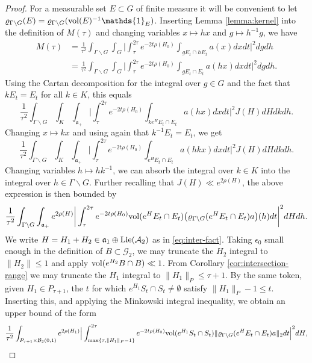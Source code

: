 \documentclass[12pt]{amsart}
\theoremstyle{remark}
\newcommand{\ga}{\mathfrak a}
\begin{document}
\begin{proof}
For a measurable set $E\subset G$ of finite measure it will be convenient to let $\varrho_{\Gamma\backslash G}(E)=\varrho_{\Gamma\backslash G}({\rm vol}(E)^{-1}{\mathds{1}}_E)$.  Inserting Lemma \ref{lemma:kernel} into the definition of $M(\tau)$ and changing variables $x\mapsto hx$ and $g\mapsto h^{-1}g$, we have
\begin{align*}
M(\tau)&=\frac{1}{\tau^2}\int_{\Gamma\backslash G}\int_G \bigg| \int_{\tau}^{2\tau} e^{-2t\rho(H_0)}\int_{gE_t\cap hE_t}a(x)dx dt\bigg|^2dg dh\\
&=\frac{1}{\tau^2}\int_{\Gamma\backslash G}\int_G \bigg| \int_{\tau}^{2\tau} e^{-2t\rho(H_0)}\int_{gE_t\cap E_t}a(hx)dx dt\bigg|^2dg dh.
\end{align*}
Using the Cartan decomposition for the integral over $g\in G$ and the fact that $kE_t=E_t$ for all $k\in K$, this equals
\[
\frac{1}{\tau^2}\int_{\Gamma\backslash G}\int_K \int_{\ga_+} \bigg| \int_{\tau}^{2\tau} e^{-2t\rho(H_0)}\int_{ke^H E_t\cap E_t}a(hx)dx dt\bigg|^2 J(H) dH dk dh.
\]
Changing $x\mapsto kx$ and using again that $k^{-1}E_t=E_t$, we get
\[
\frac{1}{\tau^2}\int_{\Gamma\backslash G}\int_K \int_{\ga_+} \bigg| \int_{\tau}^{2\tau} e^{-2t\rho(H_0)}\int_{e^H E_t\cap E_t}a(hkx)dx dt\bigg|^2 J(H) dH dk dh.
\]
Changing variables $h\mapsto hk^{-1}$, we can absorb the integral over $k\in K$ into the integral over $h\in \Gamma\backslash G$. Further recalling that $J(H) \ll e^{ 2 \rho ( H )}$, the above expression is then bounded by
\[
\frac{1}{\tau^2}\int_{\Gamma\backslash G}\int_{\ga_+} e^{2 \rho( H)}\bigg| \int_{\tau}^{2\tau} e^{-2t\rho(H_0)} {\rm vol}(e^H E_t\cap E_t)\big(\varrho_{\Gamma\backslash G} (e^H E_t\cap E_t)a \big)(h) dt\bigg|^2dH dh.
\]
We write $H=H_1+H_2\in \ga_1\oplus{\rm Lie}(\mathcal{A}_2)$ as in \eqref{eq:inter-fact}. Taking $\epsilon_0$ small enough in the definition of $B\subset\mathcal{G}_2$, we may truncate the $H_2$ integral to $\|H_2\|\leq 1$ and apply ${\rm vol}(e^{H_2}B\cap B) \ll 1$. From Corollary \ref{cor:intersection-range} we may truncate the $H_1$ integral to $\|H_1\|_P\leq \tau+1$. By the same token, given $H_1 \in P_{\tau + 1}$, the $t$ for which $e^{H_1}S_t \cap S_t \neq \emptyset$ satisfy $\|H_1\|_P - 1 \leq t $. Inserting this, and applying the Minkowski integral inequality, we obtain an upper bound of the form
\[
\frac{1}{\tau^2} \int_{P_{\tau + 1}\times \mathcal{B}_2(0,1)} e^{2 \rho(H_1)} \Big| \int_{\max\{\tau, \|H_1\|_P - 1\}}^{2\tau} e^{- 2t \rho( H_0 )} \textnormal{vol}(e^{H_1}S_t \cap  S_t)\|\varrho_{\Gamma\backslash G}(e^H E_t\cap E_t)a\|_2dt \Big|^2 dH,
\]
\end{proof}
\end{document}
